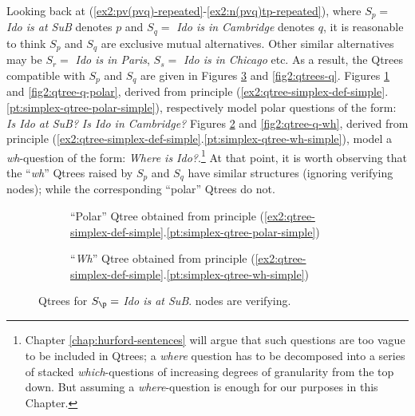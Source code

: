 Looking back at (\ref{ex2:pv(pvq)-repeated}-\ref{ex2:n(pvq)tp-repeated}), where $S_p=$ \textit{Ido is at SuB} denotes $p$ and $S_q=$ \textit{Ido is in Cambridge} denotes $q$, it is reasonable to think $S_p$ and $S_q$ are exclusive mutual alternatives. Other similar alternatives may be $S_r=$ \textit{Ido is in Paris}, $S_s=$ \textit{Ido is in Chicago} etc. As a result, the Qtrees compatible with $S_p$ and $S_q$ are given in Figures \ref{fig2:qtrees-p} and \ref{fig2:qtrees-q}. Figures \ref{fig2:qtree-p-polar} and \ref{fig2:qtree-q-polar}, derived from principle (\ref{ex2:qtree-simplex-def-simple}.\ref{pt:simplex-qtree-polar-simple}), respectively model polar questions of the form: \textit{Is Ido at SuB?} \textit{Is Ido in Cambridge?} Figures \ref{fig2:qtree-p-wh} and \ref{fig2:qtree-q-wh}, derived from principle (\ref{ex2:qtree-simplex-def-simple}.\ref{pt:simplex-qtree-wh-simple}), model a \textit{wh}-question of the form: \textit{Where is Ido?}.\footnote{Chapter \ref{chap:hurford-sentences} will argue that such questions are too vague to be included in Qtrees; a \textit{where} question has to be decomposed into a series of stacked \textit{which}-questions of increasing degrees of granularity from the top down. But assuming a \textit{where}-question is enough for our purposes in this Chapter.} At that point, it is worth observing that the ``\textit{wh}'' Qtrees raised by $S_p$ and $S_q$ have similar structures (ignoring verifying nodes); while the corresponding ``polar'' Qtrees do not.


	\begin{figure}[H]
		\centering
		\begin{subfigure}[b]{.3\linewidth}
			\centering
			\scalebox{1}{
				\begin{forest}
					[CS [\fbox{$\p$}][$\neg \p$]]
				\end{forest}
			}
			\caption{``Polar'' Qtree obtained from principle (\ref{ex2:qtree-simplex-def-simple}.\ref{pt:simplex-qtree-polar-simple})}\label{fig2:qtree-p-polar}
		\end{subfigure}\qquad
		\begin{subfigure}[b]{.3\linewidth}
			\centering
			\scalebox{1}{
				\begin{forest}
					[CS [\fbox{$\p$}][$\q$][$\r$][...]]
				\end{forest}
			}
			\caption{``\textit{Wh}'' Qtree obtained from principle (\ref{ex2:qtree-simplex-def-simple}.\ref{pt:simplex-qtree-wh-simple})}\label{fig2:qtree-p-wh}
		\end{subfigure}
		\caption{Qtrees for $S\protect_{\p}=$ \textit{Ido is at SuB}. \setlength{\fboxsep}{1pt} nodes are verifying.}
		\label{fig2:qtrees-p}
	\end{figure}
	
